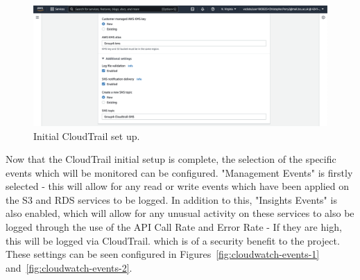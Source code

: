 \begin{figure}[!htbp]
    \centering
    \includegraphics[width=\textwidth]{resources/cloudtrail/cloudtrail-general-2}
    \caption{Initial CloudTrail set up.}
    \label{fig:cloudwatch-general-2}
\end{figure}

Now that the CloudTrail initial setup is complete, the selection of the specific events which will be monitored can be
configured.
"Management Events" is firstly selected - this will allow for any read or write events which have been applied on
the S3 and RDS services to be logged.
In addition to this, "Insights Events" is also enabled, which will allow for any unusual activity on these services to
also be logged through the use of the API Call Rate and Error Rate - If they are high, this will be logged via CloudTrail.
which is of a security benefit to the project.
These settings can be seen configured in Figures~\ref{fig:cloudwatch-events-1} and~\ref{fig:cloudwatch-events-2}.

